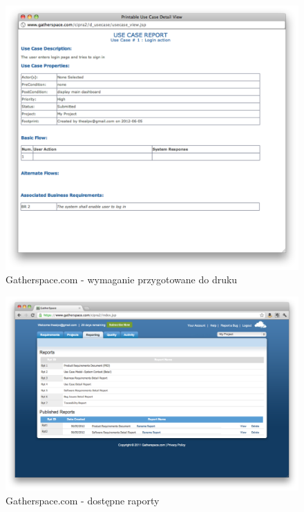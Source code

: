      \begin{figure}[t]
        \centering
        \includegraphics[width=1.0\textwidth]{img/gatherspace_9.pdf}
        \caption{Gatherspace.com - wymaganie przygotowane do druku}
        \label{fig:gatherspace_9}
      \end{figure}

      \begin{figure}[t]
        \centering
        \includegraphics[width=1.0\textwidth]{img/gatherspace_11.pdf}
        \caption{Gatherspace.com - dostępne raporty}
        \label{fig:gatherspace_11}
      \end{figure}

